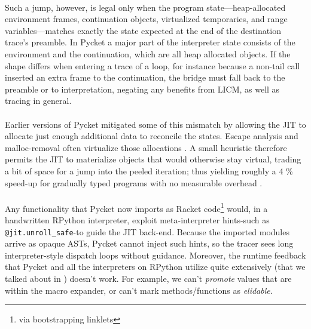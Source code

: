 	\paragraph{}%
		Such a jump, however, is legal only when the program state—heap-allocated environment frames, continuation objects, virtualized temporaries, and range variables—matches exactly the state expected at the end of the destination trace's preamble. In Pycket a major part of the interpreter state consists of the environment and the continuation, which are all heap allocated objects. If the shape differs when entering a trace of a loop, for instance because a non-tail call inserted an extra frame to the continuation, the bridge must fall back to the preamble or to interpretation, negating any benefits from LICM, as well as tracing in general.

	\paragraph{}%
		Earlier versions of Pycket mitigated some of this mismatch by allowing the JIT to allocate just enough additional data to reconcile the states. Escape analysis and malloc-removal often virtualize those allocations \cite{malloc-removal:11,loop-aware:12}. A small heuristic therefore permits the JIT to materialize objects that would otherwise stay virtual, trading a bit of space for a jump into the peeled iteration; thus yielding roughly a 4 \% speed-up for gradually typed programs with no measurable overhead \cite{pycketmain2}.

	\paragraph{}%
		Any functionality that Pycket now imports as Racket code\footnote{via bootstrapping linklets} would, in a handwritten RPython interpreter, exploit meta-interpreter hints-such as \verb|@jit.unroll_safe|-to guide the JIT back-end. Because the imported modules arrive as opaque ASTs, Pycket cannot inject such hints, so the tracer sees long interpreter-style dispatch loops without guidance. Moreover, the runtime feedback that Pycket and all the interpreters on RPython utilize quite extensively (that we talked about in ) doesn't work. For example, we can't \emph{promote} values that are within the macro expander, or can't mark methods/functions as \emph{elidable}.

